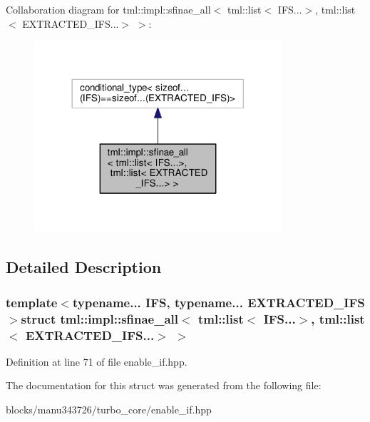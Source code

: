 Collaboration diagram for tml\+:\+:impl\+:\+:sfinae\+\_\+all$<$ tml\+:\+:list$<$ I\+F\+S...$>$, tml\+:\+:list$<$ E\+X\+T\+R\+A\+C\+T\+E\+D\+\_\+\+I\+F\+S...$>$ $>$\+:
\nopagebreak
\begin{figure}[H]
\begin{center}
\leavevmode
\includegraphics[width=260pt]{structtml_1_1impl_1_1sfinae__all_3_01tml_1_1list_3_01_i_f_s_8_8_8_4_00_01tml_1_1list_3_01_e_x_t_b49e84c2419a590685368af1dc886082}
\end{center}
\end{figure}


\subsection{Detailed Description}
\subsubsection*{template$<$typename... I\+F\+S, typename... E\+X\+T\+R\+A\+C\+T\+E\+D\+\_\+\+I\+F\+S$>$struct tml\+::impl\+::sfinae\+\_\+all$<$ tml\+::list$<$ I\+F\+S...$>$, tml\+::list$<$ E\+X\+T\+R\+A\+C\+T\+E\+D\+\_\+\+I\+F\+S...$>$ $>$}



Definition at line 71 of file enable\+\_\+if.\+hpp.



The documentation for this struct was generated from the following file\+:\begin{DoxyCompactItemize}
\item 
blocks/manu343726/turbo\+\_\+core/enable\+\_\+if.\+hpp\end{DoxyCompactItemize}
